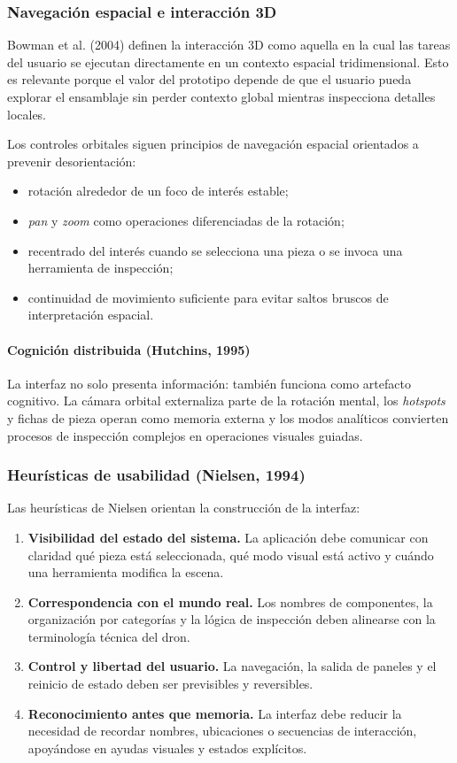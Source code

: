 \subsubsection{Navegación espacial e interacción 3D}

Bowman et al. (2004) definen la interacción 3D como aquella en la cual las tareas del usuario se ejecutan directamente en un contexto espacial tridimensional. Esto es relevante porque el valor del prototipo depende de que el usuario pueda explorar el ensamblaje sin perder contexto global mientras inspecciona detalles locales.

Los controles orbitales siguen principios de navegación espacial orientados a prevenir desorientación:
\begin{itemize}
    \item rotación alrededor de un foco de interés estable;
    \item \textit{pan} y \textit{zoom} como operaciones diferenciadas de la rotación;
    \item recentrado del interés cuando se selecciona una pieza o se invoca una herramienta de inspección;
    \item continuidad de movimiento suficiente para evitar saltos bruscos de interpretación espacial.
\end{itemize}

\paragraph{Cognición distribuida (Hutchins, 1995)} La interfaz no solo presenta información: también funciona como artefacto cognitivo. La cámara orbital externaliza parte de la rotación mental, los \textit{hotspots} y fichas de pieza operan como memoria externa y los modos analíticos convierten procesos de inspección complejos en operaciones visuales guiadas.

\subsubsection{Heurísticas de usabilidad (Nielsen, 1994)}

Las heurísticas de Nielsen orientan la construcción de la interfaz:
\begin{enumerate}
    \item \textbf{Visibilidad del estado del sistema.} La aplicación debe comunicar con claridad qué pieza está seleccionada, qué modo visual está activo y cuándo una herramienta modifica la escena.
    \item \textbf{Correspondencia con el mundo real.} Los nombres de componentes, la organización por categorías y la lógica de inspección deben alinearse con la terminología técnica del dron.
    \item \textbf{Control y libertad del usuario.} La navegación, la salida de paneles y el reinicio de estado deben ser previsibles y reversibles.
    \item \textbf{Reconocimiento antes que memoria.} La interfaz debe reducir la necesidad de recordar nombres, ubicaciones o secuencias de interacción, apoyándose en ayudas visuales y estados explícitos.
\end{enumerate}

